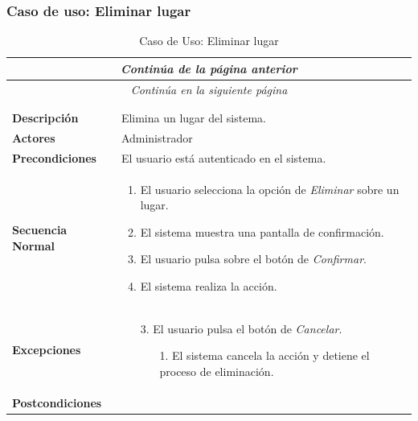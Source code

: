 \newpage
\subsubsection*{Caso de uso: Eliminar lugar }
\begin{longtable}{| p{4cm} | p{10cm} |}
\endfirsthead
\multicolumn{2}{c}{\textit{Continúa de la página anterior}}\\[12pt]
\hline
\endhead
\hline
\multicolumn{2}{c}{\textit{Continúa en la siguiente página}} \\
\endfoot
\hline
\caption{Caso de Uso: Eliminar lugar}\label{fig:1}\\
\endlastfoot


\hline
\multicolumn{2}{|c|}{\textbf{CU$<$36$>$ - Eliminar Lugar}} \\

\hline
\textbf{Descripción} &
Elimina un lugar del sistema.\\

\hline
\textbf{Actores} &
Administrador\\

\hline
\textbf{Precondiciones} &
El usuario está autenticado en el sistema.\\

\hline
\textbf{Secuencia Normal} &\mbox{}\par\vspace{-\baselineskip}
\begin{enumerate}[leftmargin=0.7cm, topsep=0.1cm]
\item El usuario selecciona la opción de \textit{Eliminar} sobre un lugar.
\item El sistema muestra una pantalla de confirmación.
\item El usuario pulsa sobre el botón de \textit{Confirmar}.
\item El sistema realiza la acción.
\end{enumerate}


\\
\hline
\textbf{Excepciones} &\mbox{}\par\vspace{-\baselineskip}
\begin{enumerate}[leftmargin=0.9cm, topsep=0.1cm]
\item[3.] El usuario pulsa el botón de \textit{Cancelar}.
	\begin{itemize}
	\item[1.] El sistema cancela la acción y detiene el proceso de eliminación.
	\end{itemize}
\end{enumerate}
\\

\hline
\textbf{Postcondiciones} & \\
\hline
\end{longtable}



